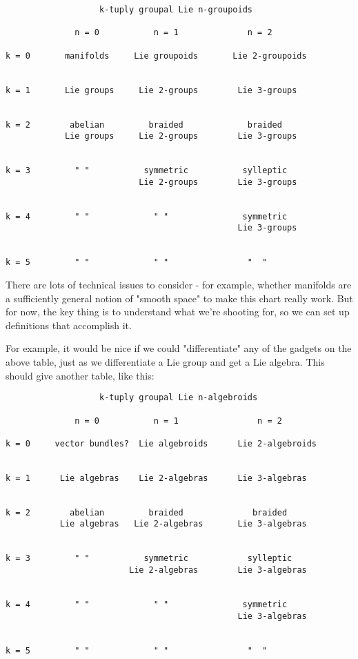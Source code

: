\begin{verbatim}
                   k-tuply groupal Lie n-groupoids 

              n = 0           n = 1              n = 2

k = 0       manifolds     Lie groupoids       Lie 2-groupoids
     

k = 1       Lie groups     Lie 2-groups        Lie 3-groups


k = 2        abelian         braided             braided
            Lie groups     Lie 2-groups        Lie 3-groups


k = 3         " "           symmetric           sylleptic
                           Lie 2-groups        Lie 3-groups


k = 4         " "             " "               symmetric
                                               Lie 3-groups


k = 5         " "             " "                "  "
\end{verbatim}
    

There are lots of technical issues to consider - for example, whether
manifolds are a sufficiently general notion of "smooth space" to
make this chart really work.  But for now, the key thing is to 
understand what we're shooting for, so we can set up definitions that 
accomplish it.

For example, it would be nice if we could "differentiate" any of the 
gadgets on the above table, just as we differentiate a Lie group
and get a Lie algebra.  This should give another table, like this:

\begin{verbatim}
                   k-tuply groupal Lie n-algebroids 

              n = 0           n = 1                n = 2

k = 0     vector bundles?  Lie algebroids      Lie 2-algebroids
     

k = 1      Lie algebras    Lie 2-algebras      Lie 3-algebras


k = 2        abelian         braided              braided
           Lie algebras   Lie 2-algebras       Lie 3-algebras


k = 3         " "           symmetric            sylleptic
                         Lie 2-algebras        Lie 3-algebras


k = 4         " "             " "               symmetric
                                               Lie 3-algebras


k = 5         " "             " "                "  "
\end{verbatim}
    

